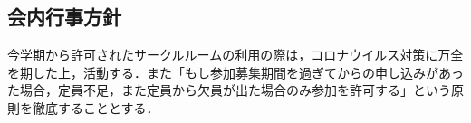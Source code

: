 \subsection*{会内行事方針}


今学期から許可されたサークルルームの利用の際は，コロナウイルス対策に万全を期した上，活動する．また「もし参加募集期間を過ぎてからの申し込みがあった場合，定員不足，また定員から欠員が出た場合のみ参加を許可する」という原則を徹底することとする．

